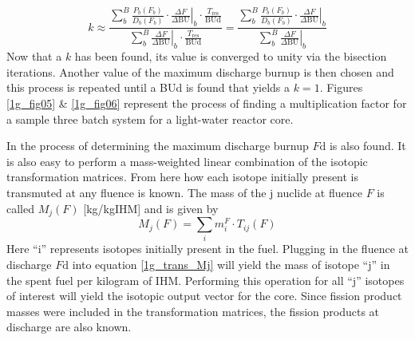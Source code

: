 \begin{equation}
\label{1g_k_batch_ave_1}
k \approx \frac{\sum_b^B \frac{P_b(F_b)}{D_b(F_b)} \cdot \left. \frac{\Delta F}{\Delta \mbox{BU}} \right|_b \cdot \frac{T_{\mbox{res}}}{\mbox{BUd}}}
                {\sum_b^B \left. \frac{\Delta F}{\Delta \mbox{BU}} \right|_b \cdot \frac{T_{\mbox{res}}}{\mbox{BUd}}}
 =  \frac{\sum_b^B \frac{P_b(F_b)}{D_b(F_b)} \cdot \left. \frac{\Delta F}{\Delta \mbox{BU}} \right|_b }
                {\sum_b^B \left. \frac{\Delta F}{\Delta \mbox{BU}} \right|_b}
\end{equation}
Now that a $k$ has been found, its value is converged to unity via the bisection iterations.  Another 
value of the maximum discharge burnup is then chosen and this process is repeated until a BUd is found 
that yields a $k = 1$.  Figures \ref{1g_fig05} \& \ref{1g_fig06} represent the process of finding a 
multiplication factor for a sample three batch system for a light-water reactor core.  

In the process of determining the maximum discharge burnup $F\mbox{d}$ is also found.  It is also 
easy to perform a mass-weighted linear combination of the isotopic transformation matrices. From here 
how each isotope initially present is transmuted at any fluence is known.  The mass of the j 
nuclide at fluence $F$ is called $M_j(F)$ [kg/kgIHM] and is given by
\begin{equation}
\label{1g_trans_Mj}
M_j(F) = \sum_i m_i^F \cdot T_{ij}(F)
\end{equation}
Here ``i'' represents isotopes initially present in the fuel.  Plugging in the fluence at discharge 
$F\mbox{d}$ into equation \ref{1g_trans_Mj} will yield the mass of isotope ``j'' in the spent fuel per 
kilogram of IHM.  Performing this operation for all ``j'' isotopes of interest will yield the isotopic 
output vector for the core.  Since fission product masses were included in the transformation matrices, 
the fission products at discharge are also known.  

